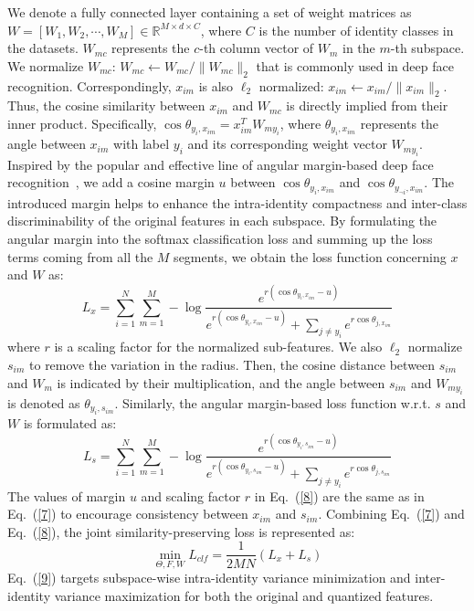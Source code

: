 \documentclass{elsarticle}
\begin{document}
We denote a fully connected layer containing a set of weight matrices as $W=[W_1, W_2, \cdots, W_M] \in \mathbb{R}^{M \times d \times C}$, where $C$ is the number of identity classes in the datasets. $W_{mc}$ represents the $c$-th column vector of $W_{m}$ in the $m$-th subspace. We normalize $W_{mc}$: $W_{mc} \leftarrow W_{mc}/\|W_{mc}\|_2$ that is commonly used in deep face recognition. Correspondingly, $x_{im}$ is also $\ell_2$ normalized: $x_{im} \leftarrow x_{im}/\|x_{im}\|_2$. Thus, the cosine similarity between $x_{im}$ and $W_{mc}$ is directly implied from their inner product. Specifically, $\cos{\theta}_{y_i, x_{im}}=x_{im}^T W_{m y_i}$, where ${\theta}_{y_i, x_{im}}$ represents the angle between $x_{im}$ with label $y_i$ and its corresponding weight vector $W_{m y_i}$. Inspired by the popular and effective line of angular margin-based deep face recognition~\cite{wang2018cosface,deng2019arcface}, we add a cosine margin $u$ between $\cos{\theta}_{y_i, x_{im}}$ and $\cos{\theta}_{y_{\neg i}, x_{im}}$. The introduced margin helps to enhance the intra-identity compactness and inter-class discriminability of the original features in each subspace. By formulating the angular margin into the softmax classification loss and summing up the loss terms coming from all the $M$ segments, we obtain the loss function concerning $x$ and $W$ as: %
\begin{equation} \label{7}
     L_{x} = \sum_{i=1}^N \sum_{m=1}^{M}-\log \frac{e^{r(\cos{\theta}_{y_i, {x_{im}}} - u)}}{e^{r(\cos{\theta}_{y_i,{x_{im}}} - u)} + \sum_{j \neq y_i} e^{r\cos{\theta}_{j, x_{im}}}} 
\end{equation}
where $r$ is a scaling factor for the normalized sub-features. We also $\ell_2$ normalize $s_{im}$ to remove the variation in the radius. Then, the cosine distance between $s_{im}$ and $W_{m}$ is indicated by their multiplication, and the angle between $s_{im}$ and $W_{m{y_i}}$ is denoted as $\theta_{y_i, s_{im}}$. Similarly, the angular margin-based loss function w.r.t. $s$ and $W$ is formulated as:
\begin{equation} \label{8}
     L_{s} = \sum_{i=1}^N \sum_{m=1}^{M}-\log \frac{e^{r(\cos{\theta}_{y_i, s_{im}} - u)}}{e^{r(\cos{\theta}_{y_i, s_{im}} - u)} + \sum_{j \neq y_i} e^{r\cos{\theta}_{j, s_{im}}}} 
\end{equation}
The values of margin $u$ and scaling factor $r$ in Eq.~(\ref{8}) are the same as in Eq.~(\ref{7}) to encourage consistency between $x_{im}$ and $s_{im}$. Combining Eq.~(\ref{7}) and Eq.~(\ref{8}), the joint similarity-preserving loss is represented as:
\begin{equation} \label{9}
     \min_{\Theta, F, W} L_{clf} = \frac{1}{2MN} \left( L_{x} + L_{s}\right)
\end{equation}
Eq.~(\ref{9}) targets subspace-wise intra-identity variance minimization and inter-identity variance maximization for both the original and quantized features. 
\end{document}
